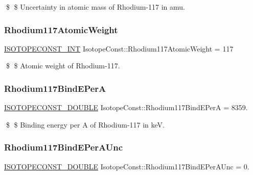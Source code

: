 \$ \$ Uncertainty in atomic mass of Rhodium-\/117 in amu. \mbox{\label{group___isotope_const-_rhodium-_rh117_ga2a638598dc9a2027a28625b3c7a35dda}} 
\subsubsection{\texorpdfstring{Rhodium117\+Atomic\+Weight}{Rhodium117AtomicWeight}}
{\footnotesize\ttfamily \mbox{\hyperlink{group___isotope_const-_macros_ga5f18360b3e99483a35c32d789e62621c}{I\+S\+O\+T\+O\+P\+E\+C\+O\+N\+S\+T\+\_\+\+I\+NT}} Isotope\+Const\+::\+Rhodium117\+Atomic\+Weight = 117}

\$ \$ Atomic weight of Rhodium-\/117. \mbox{\label{group___isotope_const-_rhodium-_rh117_ga9bbf665767334ec3ba6784e142fd5508}} 
\subsubsection{\texorpdfstring{Rhodium117\+Bind\+E\+PerA}{Rhodium117BindEPerA}}
{\footnotesize\ttfamily \mbox{\hyperlink{group___isotope_const-_macros_ga8f45a7272ce02c0b4c65c44636ed719a}{I\+S\+O\+T\+O\+P\+E\+C\+O\+N\+S\+T\+\_\+\+D\+O\+U\+B\+LE}} Isotope\+Const\+::\+Rhodium117\+Bind\+E\+PerA = 8359.}

\$ \$ Binding energy per A of Rhodium-\/117 in keV. \mbox{\label{group___isotope_const-_rhodium-_rh117_gaff588433bc7f54dcf0308c7c1b346d75}} 
\subsubsection{\texorpdfstring{Rhodium117\+Bind\+E\+Per\+A\+Unc}{Rhodium117BindEPerAUnc}}
{\footnotesize\ttfamily \mbox{\hyperlink{group___isotope_const-_macros_ga8f45a7272ce02c0b4c65c44636ed719a}{I\+S\+O\+T\+O\+P\+E\+C\+O\+N\+S\+T\+\_\+\+D\+O\+U\+B\+LE}} Isotope\+Const\+::\+Rhodium117\+Bind\+E\+Per\+A\+Unc = 0.}

